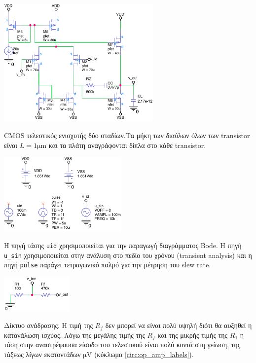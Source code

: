 \begin{center}
	\begin{circuitfig}[H]
		\centering
		\includegraphics[width=8cm]{op_amp_sim/op_amp_main.pdf}
		\caption{CMOS τελεστικός ενισχυτής δύο σταδίων.Τα μήκη των διαύλων όλων των transistor είναι $L=1\unit{\micro\meter}$ και τα πλάτη αναγράφονται δίπλα στο κάθε transistor.}
		\label{circ:op_amp_sim}
	\end{circuitfig}
	\begin{circuitfig}[H]
		\centering
		\includegraphics[width=6.3cm]{op_amp_sim/op_amp_sources.pdf}
		\caption{Η πηγή τάσης \texttt{uid} χρησιμοποιείται για την παραγωγή διαγράμματος Bode. Η πηγή \texttt{u\_sin} χρησιμοποιείται στην ανάλυση στο πεδίο του χρόνου (transient analysis) και η πηγή \texttt{pulse} παράγει τετραγωνικό παλμό για την μέτρηση του slew rate.}
		\label{circ:op_amp_sources}
	\end{circuitfig}
	\begin{circuitfig}[H]
		\centering
		\includegraphics[width=3.5cm]{op_amp_sim/op_amp_feedback_loop.pdf}
		\caption{Δίκτυο ανάδρασης. Η τιμή της $R_f$ δεν μπορεί να είναι πολύ υψηλή διότι θα αυξηθεί η κατανάλωση ισχύος. Λόγω της μεγάλης τιμής της $R_f$ και της μικρής τιμής της $R_1$ η τάση στην αναστρέφουσα είσοδο του τελεστικού είναι πολύ κοντά στη γείωση, της τάξεως λίγων εκατοντάδων $\unit{\micro\volt}$ (κύκλωμα \ref{circ:op_amp_labels}).}
		\label{circ:op_amp_feedback_loop}
	\end{circuitfig}
\end{center}

